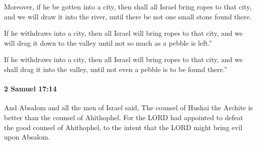 			\begin{versebox}
					\item[BHS] 
					\item[ASV] Moreover, if he be gotten into a city, then shall all Israel bring ropes to that city, and we will draw it into the river, until there be not one small stone found there.
					\item[NIV] If he withdraws into a city, then all Israel will bring ropes to that city, and we will drag it down to the valley until not so much as a pebble is left.”
					\item[NRSV] If he withdraws into a city, then all Israel will bring ropes to that city, and we shall drag it into the valley, until not even a pebble is to be found there.”
			\end{versebox}

		\paragraph{2 Samuel 17:14} %
			\label{2SAMUEL-17-14}

			And Absalom and all the men of Israel said, The counsel of Hushai the Archite is better than the counsel of Ahithophel. For the LORD had appointed to defeat the good counsel of Ahithophel, to the intent that the LORD might bring evil upon Absalom.

